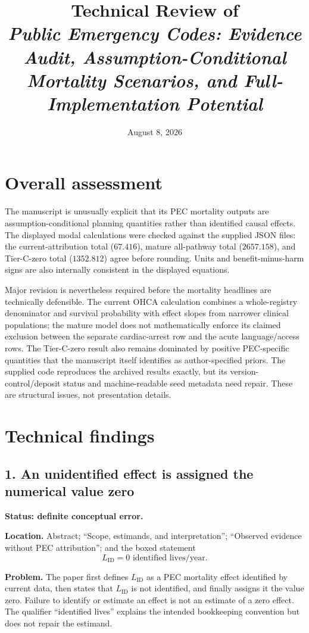 \documentclass[11pt]{article}
\title{Technical Review of\\
\emph{Public Emergency Codes: Evidence Audit, Assumption-Conditional Mortality
Scenarios, and Full-Implementation Potential}}
\author{}
\date{August 8, 2026}
\begin{document}
\maketitle

\section*{Overall assessment}

The manuscript is unusually explicit that its PEC mortality outputs are
assumption-conditional planning quantities rather than identified causal
effects.  The displayed modal calculations were checked against the supplied
JSON files: the current-attribution total ($67.416$), mature all-pathway total
($2657.158$), and Tier-C-zero total ($1352.812$) agree before rounding.  Units
and benefit-minus-harm signs are also internally consistent in the displayed
equations.

Major revision is nevertheless required before the mortality headlines are
technically defensible.  The current OHCA calculation combines a whole-registry
denominator and survival probability with effect slopes from narrower clinical
populations; the mature model does not mathematically enforce its claimed
exclusion between the separate cardiac-arrest row and the acute language/access
rows.  The Tier-C-zero result also remains dominated by positive PEC-specific
quantities that the manuscript itself identifies as author-specified priors.
The supplied code reproduces the archived results exactly, but its
version-control/deposit status and machine-readable seed metadata need repair.
These are structural issues, not presentation details.

\section*{Technical findings}

\subsection*{1. An unidentified effect is assigned the numerical value zero}

\textbf{Status: definite conceptual error.}

\textbf{Location.} Abstract; ``Scope, estimands, and interpretation'';
``Observed evidence without PEC attribution''; and the boxed statement
\[
\boxed{L_{\mathrm{ID}}=0\text{ identified lives/year}.}
\]

\textbf{Problem.} The paper first defines $L_{\mathrm{ID}}$ as a PEC mortality
effect identified by current data, then states that $L_{\mathrm{ID}}$ is not
identified, and finally assigns it the value zero.  Failure to identify or
estimate an effect is not an estimate of a zero effect.  The qualifier
``identified lives'' explains the intended bookkeeping convention but does not
repair the estimand.
\end{document}
